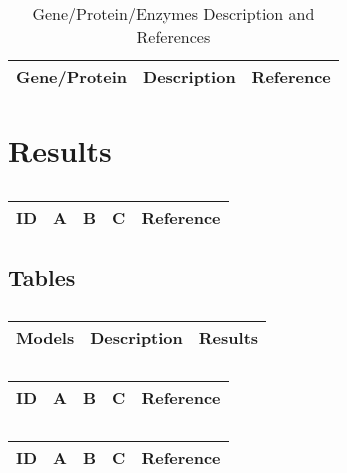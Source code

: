 \begin{enuemrate}
\centering	
\begin{table}[H]\tiny
\caption{Gene/Protein/Enzymes Description and References}	
\begin{tabular}{r|p{3cm}|l}
\hline	
Gene/Protein & Description & Reference \\
\hline 
\hline 
\end{tabular}
\end{table}

\section{Results}

\centering
\begin{table}[H]\footnotesize
	\caption{}
	\begin{tabular}{rp{1cm}p{2cm}p{3cm}p{1cm}}
		\hline
		ID & A & B & C & Reference \\
		\hline
		\hline
	\end{tabular}
\end{table}
\raggedright


\subsection{Tables}

\centering	
\begin{table}[H]\tiny
	\caption{}	
	\begin{tabular}{r|p{4cm}|l}
		\hline	
		Models & Description & Results \\
		\hline 
		\hline 
	\end{tabular}
\end{table}

\centering
\begin{table}[H]\footnotesize
	\caption{}
	\begin{tabular}{rp{1cm}p{2cm}p{3cm}p{1cm}}
		\hline
		ID & A & B & C & Reference \\
		\hline
		\hline
	\end{tabular}
\end{table}
\raggedright

\centering
\begin{table}[H]\footnotesize
	\caption{}
	\begin{tabular}{rp{1cm}p{2cm}p{3cm}p{1cm}}
		\hline
		ID & A & B & C & Reference \\
		\hline
		\hline
	\end{tabular}
\end{table}
\raggedright



\end{enuemrate}
